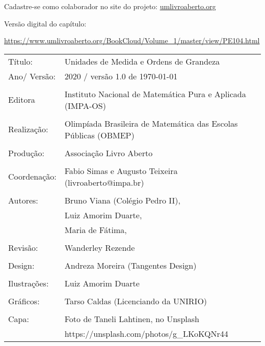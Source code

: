 \vspace*{.3cm}

Cadastre-se como colaborador no site do projeto: \url{umlivroaberto.org}

Versão digital do capítulo:

\url{https://www.umlivroaberto.org/BookCloud/Volume_1/master/view/PE104.html}


\begin{tabular}{p{}p{}}
Título: & Unidades de Medida e Ordens de Grandeza\\
Ano/ Versão: & 2020 / versão 1.0 de \today\\
\\
Editora & Instituto Nacional de Matem\'atica Pura e Aplicada (IMPA-OS)\\
\\
Realização:& Olimp\'iada Brasileira de Matem\'atica das Escolas P\'ublicas (OBMEP)\\
\\
Produção:& Associação Livro Aberto\\
\\
Coordenação: & Fabio Simas e Augusto Teixeira (livroaberto@impa.br)\\
\\
Autores: & Bruno Viana (Colégio Pedro II), \\
 		 & Luiz Amorim Duarte, \\
 		 & Maria de Fátima,\\
\\
Revisão: & Wanderley Rezende \\
\\
Design: & Andreza Moreira (Tangentes Design) \\
\\
Ilustrações: & Luiz Amorim Duarte \\ 
\\
Gráficos: & Tarso Caldas (Licenciando da UNIRIO) \\
\\
Capa: & Foto de Taneli Lahtinen, no Unsplash \\
	  & https://unsplash.com/photos/g\_LKoKQNr44 \\

\end{tabular}
\vspace{.5cm}


